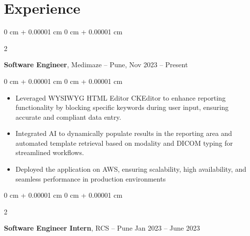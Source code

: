 \documentclass[10pt, letterpaper]{article}
\newenvironment{highlights}{
    \begin{itemize}[
        topsep=0.10 cm,
        parsep=0.10 cm,
        partopsep=0pt,
        itemsep=0pt,
        leftmargin=0 cm + 10pt
    ]
}{
    \end{itemize}
} %
\newenvironment{onecolentry}{
    \begin{adjustwidth}{
        0 cm + 0.00001 cm
    }{
        0 cm + 0.00001 cm
    }
}{
    \end{adjustwidth}
} %
\newenvironment{twocolentry}[2][]{
    \onecolentry
    \def\secondColumn{#2}
    \setcolumnwidth{\fill, 4.5 cm}
    \begin{paracol}{2}
}{
    \switchcolumn \raggedleft \secondColumn
    \end{paracol}
    \endonecolentry
} %
\begin{document}


    \section{Experience}

        
        \begin{twocolentry}{
            Nov 2023 – Present
        }
            \textbf{Software Engineer}, Medimaze -- Pune, \end{twocolentry}

        \vspace{0.10 cm}
        \begin{onecolentry}
            \begin{highlights}
                \item Leveraged WYSIWYG HTML Editor CKEditor to enhance reporting functionality by blocking specific keywords during user input, ensuring accurate and compliant data entry.
                \item Integrated AI to dynamically populate results in the reporting area and automated template retrieval based on modality and DICOM typing for streamlined workflows.
                \item Deployed the application on AWS, ensuring scalability, high availability, and seamless performance in production environments
            \end{highlights}
        \end{onecolentry}


        \vspace{0.2 cm}

        \begin{twocolentry}{
            Jan 2023 – June 2023
        }
            \textbf{Software Engineer Intern}, RCS -- Pune\end{twocolentry}
\end{document}
